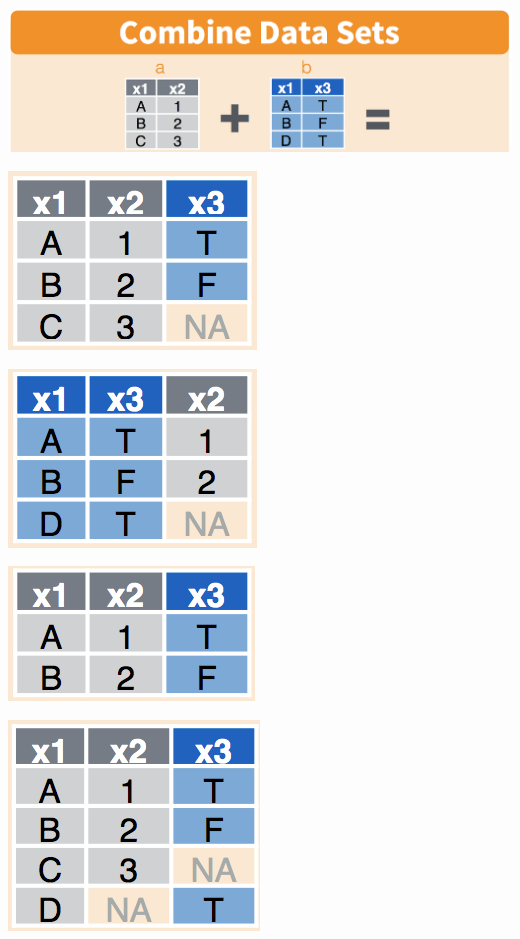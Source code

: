 \documentclass[ignorenonframetext,]{beamer}
\begin{document}
\begin{frame}{}
\protect\hypertarget{section}{}


\begin{center}\includegraphics[width=0.5\linewidth]{combinando_dplyr} \end{center}

\begin{flushleft}\includegraphics[width=0.2\linewidth]{comb_dplyr1} \end{flushleft}

\begin{flushleft}\includegraphics[width=0.2\linewidth]{comb_dplyr2} \end{flushleft}

\begin{flushright}\includegraphics[width=0.2\linewidth]{comb_dplyr3} \end{flushright}

\begin{flushright}\includegraphics[width=0.2\linewidth]{comb_dplyr4} \end{flushright}

\end{frame}
\end{document}
